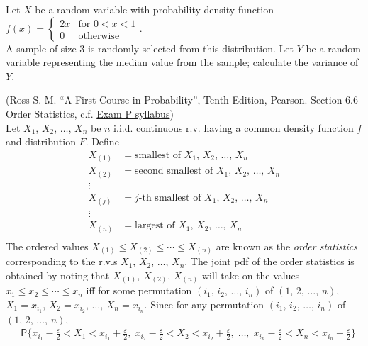\documentclass[addpoints,12pt,a4paper]{exam}
\newcommand{\ds}{\displaystyle}
\newcommand{\prb}{\mathsf{P}}
\begin{document}

\begin{questions}
  \pointname{\%}

  \question Let $X$ be a random variable with probability density function $\ds f(x) = \begin{cases}2x & \text{for } 0 < x < 1 \\ 0 & \text{otherwise} \end{cases}$. \\A sample of size $3$ is randomly selected from this distribution. Let $Y$ be a random variable representing the median value from the sample; calculate the variance of $Y$.
  \begin{solution} (Ross S. M. ``A First Course in Probability'', Tenth Edition, Pearson. Section 6.6 Order Statistics, c.f. \href{https://www.soa.org/4ae412/globalassets/assets/files/edu/2024/2024-01-exam-p-syllabus.pdf}{Exam P syllabus}) \\
    Let $X_1$, $X_2$, $\ldots$, $X_n$ be $n$ i.i.d. continuous r.v. having a common density function $f$ and distribution $F$. Define
  \begin{align*}
    X_{(1)} &= \text{smallest of }X_1,\,X_2,\,\ldots,\,X_n \\
    X_{(2)} &= \text{second smallest of }X_1,\,X_2,\,\ldots,\,X_n \\
    \vdots  & \\
    X_{(j)} &= j\text{-th smallest of }X_1,\,X_2,\,\ldots,\,X_n \\
    \vdots  & \\
    X_{(n)} &= \text{largest of }X_1,\,X_2,\,\ldots,\,X_n \\
  \end{align*}
  The ordered values $X_{(1)}\leqslant X_{(2)}\leqslant \cdots\leqslant X_{(n)}$ are known as the \emph{order statistics} corresponding to the r.v.s $X_1,\,X_2,\,\ldots,\,X_n$. The joint pdf of the order statistics is obtained by noting that $X_{(1)},\,X_{(2)},\,X_{(n)}$ will take on the values $x_1\leqslant x_2\leqslant\cdots\leqslant x_n$ iff for some permutation $(i_1,\,i_2,\,\ldots,\,i_n)$ of $(1,\,2,\,\ldots,\,n)$, $X_1 = x_{i_1},\, X_2 = x_{i_2},\,\ldots,\,X_n = x_{i_n}$. Since for any permutation $(i_1,\,i_2,\,\ldots,\,i_n)$ of $(1,\,2,\,\ldots,\,n)$, 
  \begin{align*}
    &\prb\Big\{x_{i_1} - \frac{\varepsilon}{2} < X_1 < x_{i_1} + \frac{\varepsilon}{2},\;x_{i_2} - \frac{\varepsilon}{2} < X_2 < x_{i_2} + \frac{\varepsilon}{2},\;\ldots,\;x_{i_n} - \frac{\varepsilon}{2} < X_n < x_{i_n} + \frac{\varepsilon}{2}\Big\} \\

\end{align*}
\end{solution}
\end{questions}
\end{document}
